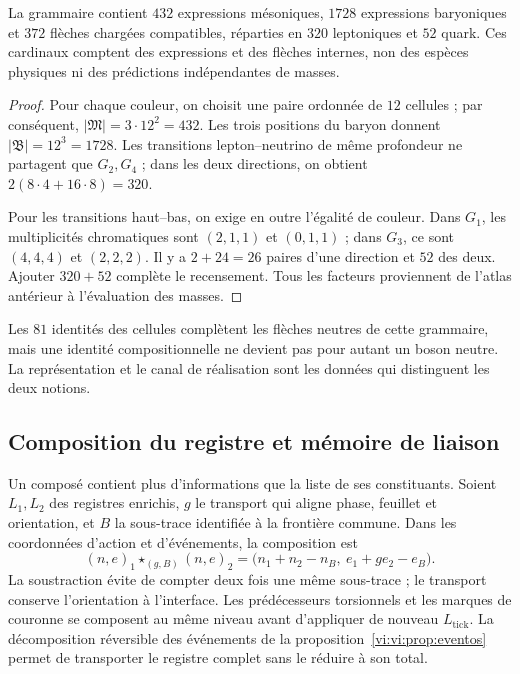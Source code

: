 \begin{proposition}
\label{vi:vi:prop:censo-compuestos}
La grammaire contient \(432\) expressions mésoniques, \(1728\)
expressions baryoniques et \(372\) flèches chargées compatibles, réparties
en \(320\) leptoniques et \(52\) quark. Ces cardinaux comptent
des expressions et des flèches internes, non des espèces physiques ni des prédictions
indépendantes de masses.
\end{proposition}
\begin{proof}
Pour chaque couleur, on choisit une paire ordonnée de \(12\) cellules ; par conséquent,
\(|\mathfrak M|=3\cdot12^2=432\). Les trois positions du baryon donnent
\(|\mathfrak B|=12^3=1728\). Les transitions lepton--neutrino de
même profondeur ne partagent que \(G_2,G_4\) ; dans les deux directions, on
obtient \(2(8\cdot4+16\cdot8)=320\).

Pour les transitions haut--bas, on exige en outre l’égalité de couleur.
Dans \(G_1\), les multiplicités chromatiques sont \((2,1,1)\) et
\((0,1,1)\) ; dans \(G_3\), ce sont \((4,4,4)\) et \((2,2,2)\).
Il y a \(2+24=26\) paires d’une direction et \(52\) des deux. Ajouter
\(320+52\) complète le recensement. Tous les facteurs proviennent de l’atlas
antérieur à l’évaluation des masses.
\end{proof}

Les \(81\) identités des cellules complètent les flèches neutres
de cette grammaire, mais une identité compositionnelle ne devient pas pour
autant un boson neutre. La représentation et le canal de réalisation
sont les données qui distinguent les deux notions.

\subsection{Composition du registre et mémoire de liaison}
\label{vi:vi:subsec:composicion-registro}

Un composé contient plus d’informations que la liste de ses
constituants. Soient \(L_1,L_2\) des registres enrichis, \(g\) le
transport qui aligne phase, feuillet et orientation, et \(B\) la sous-trace
identifiée à la frontière commune. Dans les coordonnées d’action et
d’événements, la composition est
\begin{equation}
 (n,e)_1\star_{(g,B)}(n,e)_2
 =\bigl(n_1+n_2-n_B,\ e_1+ge_2-e_B\bigr).
 \label{vi:vi:eq:composicion-frontera}
\end{equation}
La soustraction évite de compter deux fois une même sous-trace ; le transport
conserve l’orientation à l’interface. Les prédécesseurs torsionnels et
les marques de couronne se composent au même niveau avant d’appliquer de nouveau
\(L_{\mathrm{tick}}\). La décomposition réversible des événements
de la proposition~\ref{vi:vi:prop:eventos} permet de transporter le registre
complet sans le réduire à son total.

